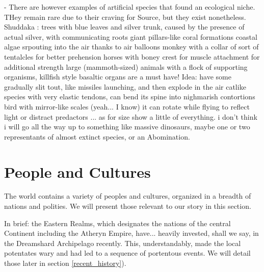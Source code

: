 - There are however examples of artificial species that found an ecological niche. THey remain rare due to their craving for Source, but they exist nonetheless. 
	Shuddaka : trees with blue leaves and silver trunk, caused by the presence of actual silver, with communicating roots
	giant pillars-like coral formations
	coastal algae srpouting into the air thanks to air balloons
	monkey with a collar of sort of tentalcles for better prehension
	horses with boney crest for muscle attachment for additional strength
	large (mammoth-sized) animals with a flock of supporting organisms, killfish style
	basaltic organs are a must have! Idea: have some gradually slit tout, like missiles launching, and then explode in the air
	catlike species with very elastic tendons, can bend its spine into nighmarish contortions
	bird with mirror-like scales (yeah... I know) it can rotate while flying to reflect light or distract predactors
... as for size show a little of everything. i don't think i will go all the way up to something like massive dinosaurs, maybe one or two representants of almost extinct species, or an Abomination.






































\section{People and Cultures}

The world contains a variety of peoples and cultures, organized in a breadth of nations and polities. We will present those relevant to our story in this section.


In brief: the Eastern Realms, which designates the nations of the central Continent including the Atheryn Empire, have... heavily invested, shall we say, in the Dreamshard Archipelago recently. This, understandably, made the local potentates wary and had led to a sequence of portentous events. We will detail those later in section \ref{recent_history}).






